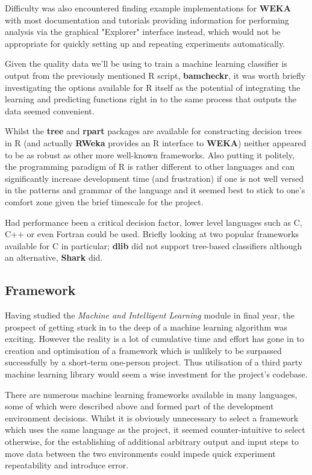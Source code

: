 Difficulty was also encountered finding example implementations for \textbf{WEKA}
with most documentation and tutorials providing information for performing
analysis via the graphical "Explorer" interface instead, which would not be
appropriate for quickly setting up and repeating experiments automatically.

Given the quality data we'll be using to train a machine learning classifier is
output from the previously mentioned R script, \textbf{bamcheckr}, it was worth
briefly investigating the options available for R itself as the potential of
integrating the learning and predicting functions right in to the same process
that outputs the data seemed convenient.

Whilst the \textbf{tree}\citep{man:rtree} and \textbf{rpart}\citep{man:rpart}
packages are available for constructing decision trees in R (and actually
\textbf{RWeka} provides an R interface to \textbf{WEKA}) neither appeared to be
as robust as other more well-known frameworks. Also putting it politely, the
programming paradigm of R\citep{man:R} is rather different to other languages
and can significantly increase development time (and frustration\citep{argh}) if
one is not well versed in the patterns and grammar of the language  and it
seemed best to stick to one's comfort zone given the brief timescale for the
project.

Had performance been a critical decision factor, lower level languages such as
C, C++ or even Fortran could be used. Briefly looking at two popular frameworks
available for C in particular; \textbf{dlib} did not support tree-based
classifiers although an alternative, \textbf{Shark} did.


\subsection{Framework}

Having studied the \textit{Machine and Intelligent Learning} module in final
year, the prospect of getting stuck in to the deep of a machine learning
algorithm was exciting. However the reality is a lot of cumulative time and
effort has gone in to creation and optimisation of a framework which is unlikely
to be surpassed successfully by a short-term one-person project. Thus
utilisation of a third party machine learning library would seem a wise
investment for the project's codebase.

There are numerous machine learning frameworks available in many languages, some
of which were described above and formed part of the development environment
decisions. Whilst it is obviously unnecessary to select a framework which uses
the same language as the project, it seemed counter-intuitive to select otherwise,
for the establishing of additional arbitrary output and input steps to move data
between the two environments could impede quick experiment repeatability and
introduce error.

